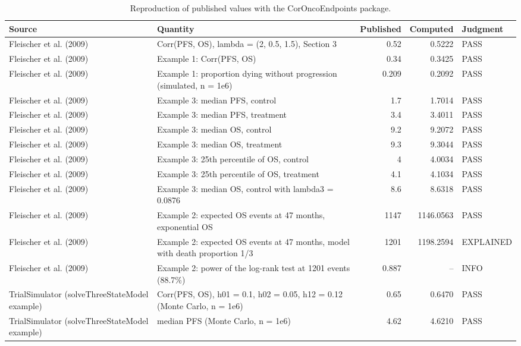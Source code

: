 \begin{table}[htbp]
\centering
\caption{Reproduction of published values with the CorOncoEndpoints package.}
\label{tab:reproduction}
\begin{threeparttable}
\scriptsize
\begin{tabular}{p{2.2cm}p{4.8cm}rrl}
\toprule
Source & Quantity & Published & Computed & Judgment \\
\midrule
Fleischer et al. (2009) & Corr(PFS, OS), lambda = (2, 0.5, 1.5), Section 3 &    0.52 & 0.5222 & PASS \\
Fleischer et al. (2009) & Example 1: Corr(PFS, OS) &    0.34 & 0.3425 & PASS \\
Fleischer et al. (2009) & Example 1: proportion dying without progression (simulated, n = 1e6) &   0.209 & 0.2092 & PASS \\
Fleischer et al. (2009) & Example 3: median PFS, control &     1.7 & 1.7014 & PASS \\
Fleischer et al. (2009) & Example 3: median PFS, treatment &     3.4 & 3.4011 & PASS \\
Fleischer et al. (2009) & Example 3: median OS, control &     9.2 & 9.2072 & PASS \\
Fleischer et al. (2009) & Example 3: median OS, treatment &     9.3 & 9.3044 & PASS \\
Fleischer et al. (2009) & Example 3: 25th percentile of OS, control &       4 & 4.0034 & PASS \\
Fleischer et al. (2009) & Example 3: 25th percentile of OS, treatment &     4.1 & 4.1034 & PASS \\
Fleischer et al. (2009) & Example 3: median OS, control with lambda3 = 0.0876 &     8.6 & 8.6318 & PASS \\
Fleischer et al. (2009) & Example 2: expected OS events at 47 months, exponential OS &    1147 & 1146.0563 & PASS \\
Fleischer et al. (2009) & Example 2: expected OS events at 47 months, model with death proportion 1/3 &    1201 & 1198.2594 & EXPLAINED\tnote{a} \\
Fleischer et al. (2009) & Example 2: power of the log-rank test at 1201 events (88.7\%) &   0.887 & -- & INFO\tnote{b} \\
TrialSimulator (solveThreeStateModel example) & Corr(PFS, OS), h01 = 0.1, h02 = 0.05, h12 = 0.12 (Monte Carlo, n = 1e6) &    0.65 & 0.6470 & PASS \\
TrialSimulator (solveThreeStateModel example) & median PFS (Monte Carlo, n = 1e6) &    4.62 & 4.6210 & PASS \\

\end{tabular}
\end{threeparttable}
\end{table}
